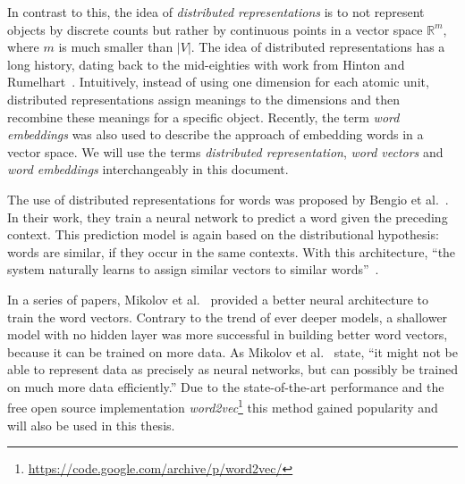 \documentclass[
        a4paper,
        titlepage,
        twoside,
        parskip
        ]{scrbook}
\theoremstyle{break}
\begin{document}
In contrast to this, the idea of \emph{distributed representations} is to not represent objects by discrete counts but rather by continuous points in a vector space $\mathbb{R}^m$, where $m$ is much smaller than $|V|$.
The idea of distributed representations has a long history, dating back to the mid-eighties with work from Hinton and Rumelhart~\cite{Hinton1986,Rumelhart1988}.
Intuitively, instead of using one dimension for each atomic unit, distributed representations assign meanings to the dimensions and then recombine these meanings for a specific object.
Recently, the term \emph{word embeddings} was also used to describe the approach of embedding words in a vector space.
We will use the terms \emph{distributed representation}, \emph{word vectors} and \emph{word embeddings} interchangeably in this document.

The use of distributed representations for words was proposed by Bengio et al.~\cite{Bengio2003}.
In their work, they train a neural network to predict a word given the preceding context.
This prediction model is again based on the distributional hypothesis: words are similar, if they occur in the same contexts.
With this architecture, ``the system naturally learns to assign similar vectors to similar words''~\cite{Baroni2014}.

In a series of papers, Mikolov et al.~\cite{Mikolov2013,Mikolov2013a,Mikolov2013b} provided a better neural architecture to train the word vectors.
Contrary to the trend of ever deeper models, a shallower model with no hidden layer was more successful in building better word vectors, because it can be trained on more data.
As Mikolov et al.~\cite{Mikolov2013a} state, ``it might not be able to represent data as precisely as neural networks, but can possibly be trained on much more data efficiently.''
Due to the state-of-the-art performance and the free open source implementation \emph{word2vec}\footnote{\url{https://code.google.com/archive/p/word2vec/}} this method gained popularity and will also be used in this thesis.
\end{document}
